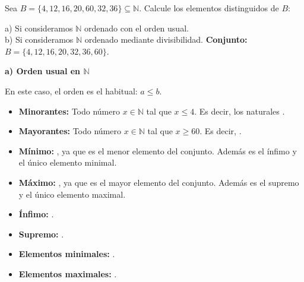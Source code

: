 \documentclass[a4paper,12pt]{article}
\begin{document}
\begin{ejercicio}[title=Ejercicio 17]
Sea $B = \{4,12,16,20,60,32,36\}\subseteq \mathbb{N}$. Calcule los elementos distinguidos de $B$:

a) Si consideramos $\mathbb{N}$ ordenado con el orden usual.\\
b) Si consideramos $\mathbb{N}$ ordenado mediante divisibilidad.
\tcblower
\textbf{Conjunto:} $B = \{4, 12, 16, 20, 32, 36, 60\}$.

\vspace{0.5em}

\textbf{a) Orden usual en $\mathbb{N}$}

En este caso, el orden es el habitual: $a \le b$.

\begin{itemize}
    \item \textbf{Minorantes:} Todo número $x \in \mathbb{N}$ tal que $x \le 4$. Es decir, los naturales .
    \item \textbf{Mayorantes:} Todo número $x \in \mathbb{N}$ tal que $x \ge 60$. Es decir, .
    \item \textbf{Mínimo:} , ya que es el menor elemento del conjunto. Además es el ínfimo y el único elemento minimal.
    \item \textbf{Máximo:} , ya que es el mayor elemento del conjunto. Además es el supremo y el único elemento maximal.
    \item \textbf{Ínfimo:} .
    \item \textbf{Supremo:} .
    \item \textbf{Elementos minimales:} .
    \item \textbf{Elementos maximales:} .
\end{itemize}

\end{ejercicio}
\end{document}
